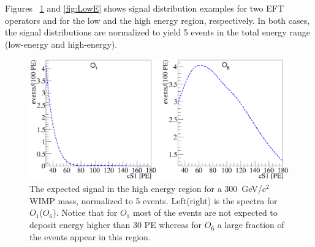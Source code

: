 Figures ~\ref{fig:HighE} and \ref{fig:LowE} shows signal distribution examples for two EFT operators and for the low and the high energy region, respectively.
In both cases, the signal distributions are normalized to yield 5 events in the total energy range (low-energy and high-energy).

\begin{figure}[h!]
\begin{minipage}{1.\linewidth}
\centerline{\includegraphics[width=1.\linewidth]{Figures/SigHighO1O6.eps}}
\end{minipage}
\caption{The expected signal in the high energy region for a 300~GeV/$c^2$ WIMP mass, normalized to 5 events. Left(right) is the spectra for $O_1$($O_6$). Notice that for $O_1$ most of the events are not expected to deposit energy higher than 30 PE whereas for $O_6$ a large fraction of the events appear in this region.}
\label{fig:HighE}
\end{figure} 

